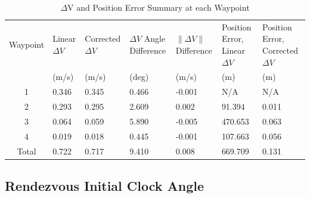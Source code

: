 \documentclass[letterpaper, preprint, paper,11pt]{AAS}	%
\begin{document}




\begin{table}[htbp] 
	\fontsize{10}{10}\selectfont
	\caption{\(\Delta\)V and Position Error Summary at each Waypoint}
	\label{tab:Results_1}
	\centering
	\begin{tabular}{c p{0.8 cm} p{1.2 cm} p{1 cm} p{1 cm} p{1.3cm} p{1.3cm}}
		\hline
		Waypoint   & Linear \(\Delta V\) & Corrected \(\Delta V\) & \(\Delta V\)  \mbox{Angle} Difference & \(\|\Delta V \|\) Difference & Position \mbox{Error}, Linear \(\Delta V\) & Position \mbox{Error}, \mbox{Corrected} \(\Delta V\) \\
		& (m/s) & (m/s) & (deg) & (m/s) & (m) & (m) \\
		\hline
		1 & 0.346 &	0.345 &	0.466 &	-0.001 &	N/A &	N/A \\
		2 & 0.293 &	0.295 &	2.609 &   0.002 &	91.394 &	0.011 \\
		3 & 0.064 &	0.059 &	5.890 &	-0.005 &	470.653 &	0.063 \\
		4 & 0.019 &	0.018 &	0.445 &	-0.001 &	107.663 &	0.056 \\
		Total & 0.722  & 0.717 & 9.410 & 0.008 & 669.709 & 0.131 \\
		\hline
	\end{tabular}
\end{table}


\subsection{Rendezvous Initial Clock Angle}
\end{document}
